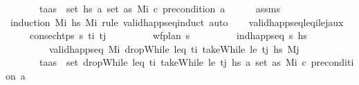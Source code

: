 \begin{isabellebody}
\ \ \ \ \ \ \ {\isachardoublequoteopen}{\isasymforall}{\isacharparenleft}{\kern0pt}t\isactrlsub a{\isacharcomma}{\kern0pt}as{\isacharparenright}{\kern0pt}\ {\isasymin}\ set\ hs{\isachardot}{\kern0pt}\ {\isasymforall}a{\isasymin}\ set\ as{\isachardot}{\kern0pt}\ M\isactrlsub i\ \isactrlsup c{\isasymTTurnstile}\isactrlsub {\isacharequal}{\kern0pt}\ precondition\ a{\isachardoublequoteclose}\isanewline
%
\isadelimproof
\ \ \ \ %
\endisadelimproof
%
\isatagproof
{}\isamarkupfalse%
\ assms\ \isamarkupfalse%
\ {\isacharparenleft}{\kern0pt}induction\ M\isactrlsub i\ hs\ M\isactrlsub i\ rule{\isacharcolon}{\kern0pt}\ valid{\isacharunderscore}{\kern0pt}happ{\isacharunderscore}{\kern0pt}seq{\isachardot}{\kern0pt}induct{\isacharparenright}{\kern0pt}\ auto%
\endisatagproof
{\isafoldproof}%
%
\isadelimproof
\isanewline
%
\endisadelimproof
\isanewline
\ \ \isamarkupfalse%
\ valid{\isacharunderscore}{\kern0pt}happ{\isacharunderscore}{\kern0pt}seq{\isacharunderscore}{\kern0pt}leq\isactrlsub i{\isacharunderscore}{\kern0pt}le\isactrlsub j{\isacharunderscore}{\kern0pt}aux{}{\isacharcolon}{\kern0pt}\isanewline
\ \ \ \ \ {\isachardoublequoteopen}consec{\isacharunderscore}{\kern0pt}htps\ {\isasympi}s\ t\isactrlsub i\ t\isactrlsub j{\isachardoublequoteclose}\isanewline
\ \ \ \ \ \ \ \ \ {\isachardoublequoteopen}wf{\isacharunderscore}{\kern0pt}plan\ {\isasympi}s{\isachardoublequoteclose}\isanewline
\ \ \ \ \ \ \ \ \ {\isachardoublequoteopen}ind{\isacharunderscore}{\kern0pt}happ{\isacharunderscore}{\kern0pt}seq\ {\isasympi}s\ hs{\isachardoublequoteclose}\isanewline
\ \ \ \ \ \ \ \ \ {\isachardoublequoteopen}valid{\isacharunderscore}{\kern0pt}happ{\isacharunderscore}{\kern0pt}seq\ M\isactrlsub i\ {\isacharparenleft}{\kern0pt}dropWhile\ {\isacharparenleft}{\kern0pt}leq\ t\isactrlsub i{\isacharparenright}{\kern0pt}\ {\isacharparenleft}{\kern0pt}takeWhile\ {\isacharparenleft}{\kern0pt}le\ t\isactrlsub j{\isacharparenright}{\kern0pt}\ hs{\isacharparenright}{\kern0pt}{\isacharparenright}{\kern0pt}\ M\isactrlsub j{\isachardoublequoteclose}\isanewline
\ \ \ \ \ \ \ {\isachardoublequoteopen}{\isasymforall}{\isacharparenleft}{\kern0pt}t\isactrlsub a{\isacharcomma}{\kern0pt}as{\isacharparenright}{\kern0pt}\ {\isasymin}\ set\ {\isacharparenleft}{\kern0pt}dropWhile\ {\isacharparenleft}{\kern0pt}leq\ t\isactrlsub i{\isacharparenright}{\kern0pt}\ {\isacharparenleft}{\kern0pt}takeWhile\ {\isacharparenleft}{\kern0pt}le\ t\isactrlsub j{\isacharparenright}{\kern0pt}\ hs{\isacharparenright}{\kern0pt}{\isacharparenright}{\kern0pt}{\isachardot}{\kern0pt}\ {\isasymforall}a{\isasymin}\ set\ as{\isachardot}{\kern0pt}\ M\isactrlsub i\ \isactrlsup c{\isasymTTurnstile}\isactrlsub {\isacharequal}{\kern0pt}\ precondition\ a{\isachardoublequoteclose}\isanewline

\end{isabellebody}
